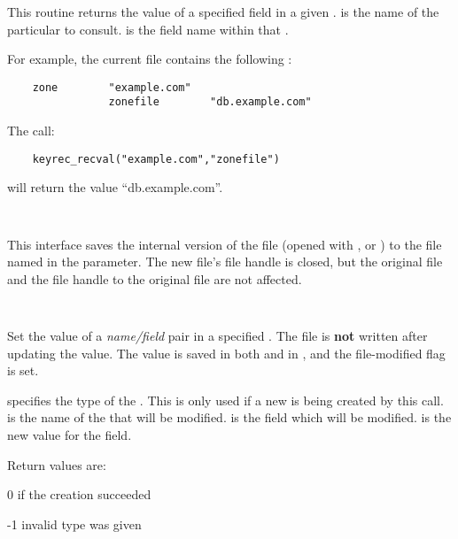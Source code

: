 \begin{description}
This routine returns the value of a specified field in a given .
 is the name of the particular  to consult.
 is the field name within that .

For example, the current  file contains the following
:

\begin{verbatim}
    zone        "example.com"
                zonefile        "db.example.com"
\end{verbatim}

The call:

\begin{verbatim}
    keyrec_recval("example.com","zonefile")
\end{verbatim}

will return the value ``db.example.com''.

\item {}\verb" "

This interface saves the internal version of the  file (opened
with ,  or )
to the file named in the  parameter.  The new file's
file handle is closed, but the original file and the file handle to the
original file are not affected.

\item {}\verb" "

Set the value of a {\it name/field} pair in a specified .  The
file is {\bf not} written after updating the value.  The value is saved in
both  and in \var{\@keyreclines}, and the file-modified flag is
set.

 specifies the type of the .  This is only
used if a new  is being created by this call.
 is the name of the  that will be modified.
 is the  field which will be modified.  
is the new value for the field.

Return values are:

\begin{description}
\item 0 if the creation succeeded
\item -1 invalid type was given
\end{description}


\end{description}
